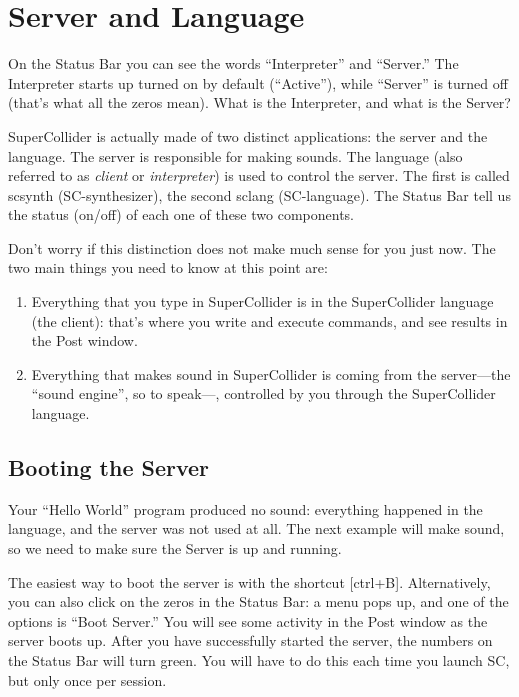 \section{Server and Language}

On the Status Bar you can see the words ``Interpreter'' and ``Server.'' The Interpreter starts up turned on by default (``Active''), while ``Server'' is turned off (that's what all the zeros  mean). What is the Interpreter, and what is the Server?

SuperCollider is actually made of two distinct applications: the server and the language. The server is responsible for making sounds. The language (also referred to as \emph{client} or \emph{interpreter}) is used to control the server. The first is called scsynth (SC-synthesizer), the second sclang (SC-language). The Status Bar tell us the status (on/off) of each one of these two components.

Don't worry if this distinction does not make much sense for you just now. The two main things you need to know at this point are:

\begin{enumerate}
\item Everything that you type in SuperCollider is in the SuperCollider language (the client): that's where you write and execute commands, and see results in the Post window.
\item Everything that makes sound in SuperCollider is coming from the server---the ``sound engine'', so to speak---, controlled by you through the SuperCollider language.
\end{enumerate}

\subsection{Booting the Server}
Your ``Hello World'' program produced no sound: everything happened in the language, and the server was not used at all. The next example will make sound, so we need to make sure the Server is up and running.

The easiest way to boot the server is with the shortcut [ctrl+B]. Alternatively, you can also click on the zeros in the Status Bar: a menu pops up, and one of the options is ``Boot Server.'' You will see some activity in the Post window as the server boots up. After you have successfully started the server, the numbers on the Status Bar will turn green. You will have to do this each time you launch SC, but only once per session.


